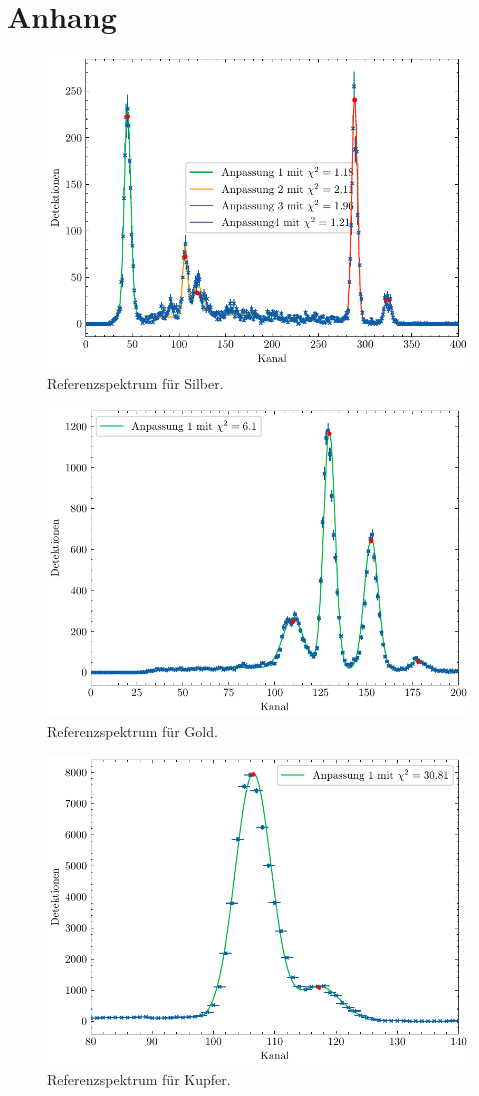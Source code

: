 \section*{Anhang}\label{sec:anhang}
\begin{figure}[H]
	\centering
	\includegraphics[width=0.6\linewidth]{../figs/Ag.pdf}
	\caption{Referenzspektrum für Silber.}
	\label{fig:ag}
\end{figure}
\begin{figure}[H]
	\centering
	\includegraphics[width=0.6\linewidth]{../figs/Au.pdf}
	\caption{Referenzspektrum für Gold.}
	\label{fig:au}
\end{figure}
\begin{figure}[H]
	\centering
	\includegraphics[width=0.6\linewidth]{../figs/Cu.pdf}
	\caption{Referenzspektrum für Kupfer.}
	\label{fig:cu}
\end{figure}

